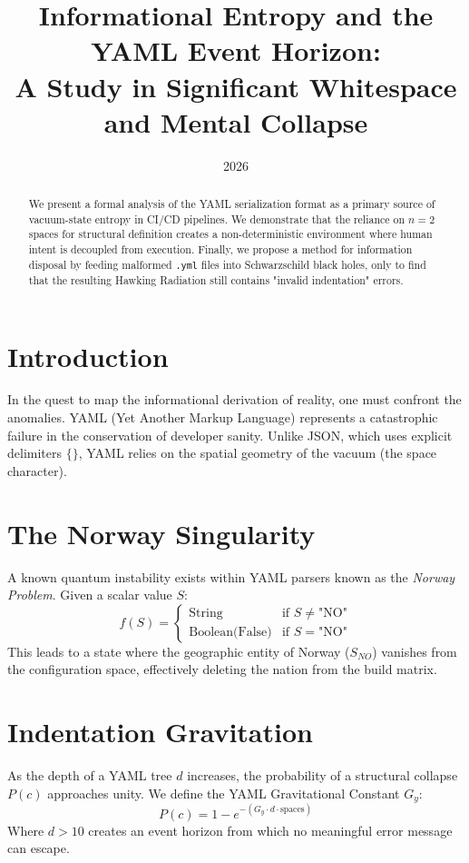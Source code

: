 \documentclass[11pt]{article}
\title{Informational Entropy and the YAML Event Horizon: \\ \large A Study in Significant Whitespace and Mental Collapse}
\date{2026}
\begin{document}
\maketitle

\begin{abstract}
We present a formal analysis of the YAML serialization format as a primary source of vacuum-state entropy in CI/CD pipelines. We demonstrate that the reliance on $n=2$ spaces for structural definition creates a non-deterministic environment where human intent is decoupled from execution. Finally, we propose a method for information disposal by feeding malformed \texttt{.yml} files into Schwarzschild black holes, only to find that the resulting Hawking Radiation still contains "invalid indentation" errors.
\end{abstract}

\section{Introduction}
In the quest to map the informational derivation of reality, one must confront the anomalies. YAML (Yet Another Markup Language) represents a catastrophic failure in the conservation of developer sanity. Unlike JSON, which uses explicit delimiters $\{\}$, YAML relies on the spatial geometry of the vacuum (the space character).

\section{The Norway Singularity}
A known quantum instability exists within YAML parsers known as the \textit{Norway Problem}. Given a scalar value $S$:
\begin{equation}
    f(S) = \begin{cases} 
      \text{String} & \text{if } S \neq \text{"NO"} \\
      \text{Boolean(False)} & \text{if } S = \text{"NO"} 
   \end{cases}
\end{equation}
This leads to a state where the geographic entity of Norway ($S_{NO}$) vanishes from the configuration space, effectively deleting the nation from the build matrix.

\section{Indentation Gravitation}
As the depth of a YAML tree $d$ increases, the probability of a structural collapse $P(c)$ approaches unity. We define the YAML Gravitational Constant $G_y$:
\begin{equation}
    P(c) = 1 - e^{-(G_y \cdot d \cdot \text{spaces})}
\end{equation}
Where $d > 10$ creates an event horizon from which no meaningful error message can escape.
\end{document}
